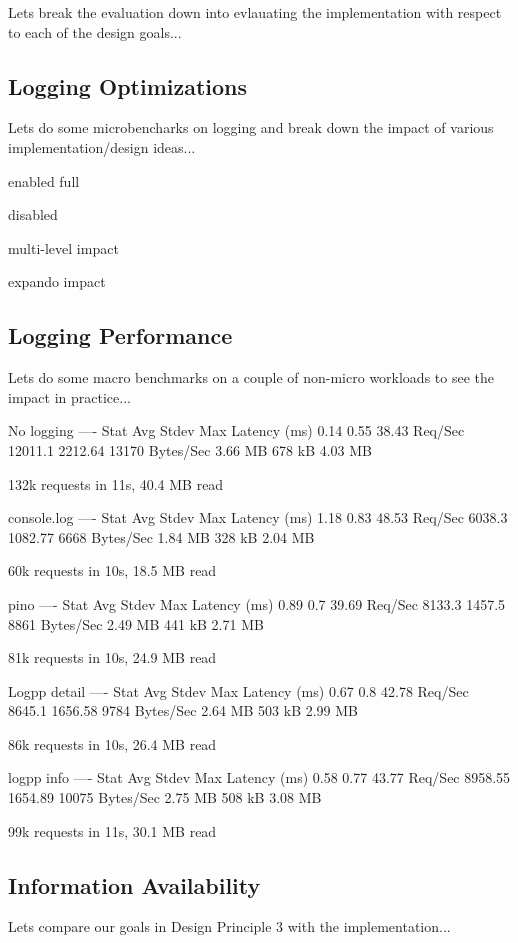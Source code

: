 Lets break the evaluation down into evlauating the implementation with respect 
to each of the design goals...

\subsection{Logging Optimizations}
Lets do some microbencharks on logging and break down the impact of various 
implementation/design ideas...

enabled full

disabled

multi-level impact

expando impact

\subsection{Logging Performance}
Lets do some macro benchmarks on a couple of non-micro workloads to see the 
impact in practice...

No logging
----
Stat         Avg     Stdev   Max
Latency (ms) 0.14    0.55    38.43
Req/Sec      12011.1 2212.64 13170
Bytes/Sec    3.66 MB 678 kB  4.03 MB

132k requests in 11s, 40.4 MB read

console.log
----
Stat         Avg     Stdev   Max
Latency (ms) 1.18    0.83    48.53
Req/Sec      6038.3  1082.77 6668
Bytes/Sec    1.84 MB 328 kB  2.04 MB

60k requests in 10s, 18.5 MB read

pino         
----
Stat         Avg     Stdev  Max
Latency (ms) 0.89    0.7    39.69
Req/Sec      8133.3  1457.5 8861
Bytes/Sec    2.49 MB 441 kB 2.71 MB

81k requests in 10s, 24.9 MB read

Logpp detail 
----
Stat         Avg     Stdev   Max
Latency (ms) 0.67    0.8     42.78
Req/Sec      8645.1  1656.58 9784
Bytes/Sec    2.64 MB 503 kB  2.99 MB

86k requests in 10s, 26.4 MB read

logpp info   
----
Stat         Avg     Stdev   Max
Latency (ms) 0.58    0.77    43.77
Req/Sec      8958.55 1654.89 10075
Bytes/Sec    2.75 MB 508 kB  3.08 MB

99k requests in 11s, 30.1 MB read

\subsection{Information Availability}
Lets compare our goals in Design Principle 3 with the implementation... 


